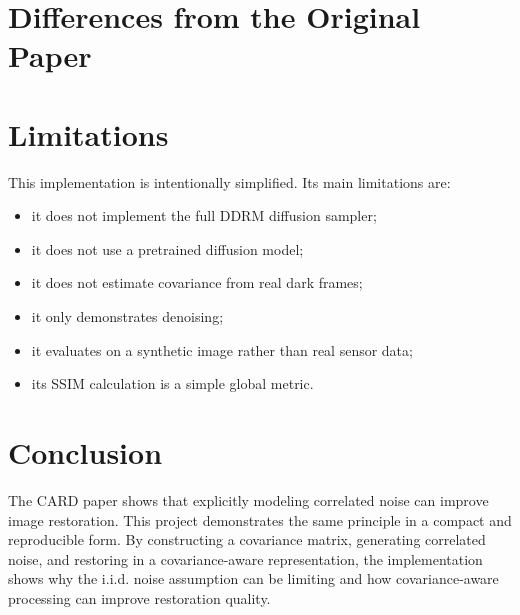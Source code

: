 \documentclass[12pt,a4paper]{article}
\begin{document}
\section{Differences from the Original Paper}

\begin{table}[h]
  \centering
  \small
  \caption{Comparison between the original paper and this implementation.}
\end{table}

\section{Limitations}

This implementation is intentionally simplified. Its main limitations are:

\begin{itemize}
  \item it does not implement the full DDRM diffusion sampler;
  \item it does not use a pretrained diffusion model;
  \item it does not estimate covariance from real dark frames;
  \item it only demonstrates denoising;
  \item it evaluates on a synthetic image rather than real sensor data;
  \item its SSIM calculation is a simple global metric.
\end{itemize}

\section{Conclusion}

The CARD paper shows that explicitly modeling correlated noise can improve image
restoration. This project demonstrates the same principle in a compact and
reproducible form. By constructing a covariance matrix, generating correlated
noise, and restoring in a covariance-aware representation, the implementation
shows why the i.i.d. noise assumption can be limiting and how covariance-aware
processing can improve restoration quality.
\end{document}
